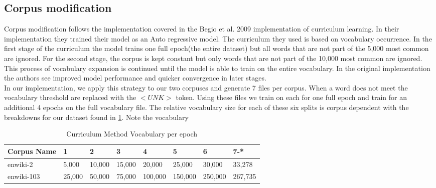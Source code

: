\subsection{Corpus modification}
Corpus modification follows the implementation covered in the Begio et al. 2009 \cite{Bengio2009CurriculumL} implementation of curriculum learning. In their implementation they trained their model as an Auto regressive model. The curriculum they used is based on vocabulary occurrence. In the first stage of the curriculum the model trains one full epoch(the entire dataset) but all words that are not part of the 5,000 most common are ignored. For the second stage, the corpus is kept constant but only words that are not part of the 10,000 most common are ignored. This process of vocabulary expansion is continued until the model is able to train on the entire vocabulary. In the original implementation the authors see improved model performance and quicker convergence in later stages. \\
In our implementation, we apply this strategy to our two corpuses and generate 7 files per corpus. When a word does not meet the vocabulary threshold are replaced with the $<UNK>$ token. Using these files we train on each for one full epoch and train for an additional 4 epochs on the full vocabulary file. The relative vocabulary size for each of these six splits is corpus dependent with the breakdowns for our dataset found in \ref{table:2}. Note the vocabulary 
\begin{table}[h!]
\begin{tabular}{|l|l|l|l|l|l|l|l|} \hline
\textbf{Corpus Name} & \textbf{1} & \textbf{2} & \textbf{3} & \textbf{4} & \textbf{5} & \textbf{6} & \textbf{7-*}  \\ \hline
enwiki-2 & 5,000 & 10,000 & 15,000 & 20,000 & 25,000 & 30,000 & 33,278 \\ \hline
enwiki-103 & 25,000 & 50,000 & 75,000 & 100,000 & 150,000  & 250,000 & 267,735\\ \hline
\end{tabular}
\caption{Curriculum Method Vocabulary per epoch}
\label{table:2}
\end{table}
